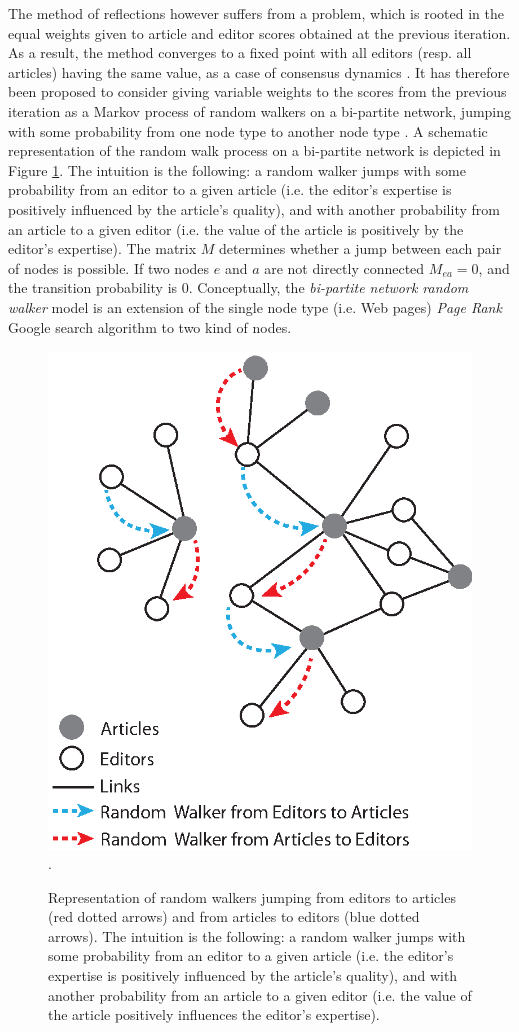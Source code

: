 The method of reflections however suffers from a problem, which is rooted in the equal weights given to article and editor scores obtained at the previous iteration. As a result, the method converges to a fixed point with all editors (resp. all articles) having the same value, as a case of consensus dynamics \cite{caldarelli2012network}. It has therefore been proposed to consider giving variable weights to the scores from the previous iteration as a Markov process of random walkers on a bi-partite network, jumping with some probability from one node type to another node type \cite{caldarelli2012network}. A schematic representation of the random walk process on a bi-partite network is depicted in Figure \ref{fig:jumpers}. The intuition is the following: a random walker jumps with some probability from an editor to a given article (i.e. the editor's expertise is positively influenced by the article's quality), and with another probability from an article to a given editor (i.e. the value of the article is positively by the editor's expertise). The matrix $M$ determines whether a jump between each pair of nodes is possible. If two nodes $e$ and $a$ are not directly connected $M_{ea} = 0$, and the transition probability is 0. Conceptually, the {\it bi-partite network random walker} model is an extension of the single node type (i.e. Web pages) {\it Page Rank} Google search algorithm \cite{page1999pagerank} to two kind of nodes.

\begin{figure}[!t]
\centering
\includegraphics[width=0.7\columnwidth]{../Figures/bi-partite_net.eps}.
\caption{Representation of random walkers jumping from editors to articles (red dotted arrows) and from articles to editors (blue dotted arrows). The intuition is the following: a random walker jumps with some probability from an editor to a given article (i.e. the editor's expertise is positively influenced by the article's quality), and with another probability from an article to a given editor (i.e. the value of the article positively influences the editor's expertise).}
\label{fig:jumpers}
\end{figure}

